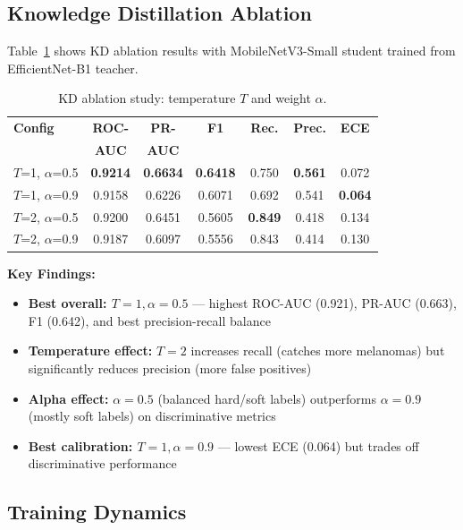 \documentclass[conference]{IEEEtran}
\begin{document}
\subsection{Knowledge Distillation Ablation}

Table~\ref{tab:kd_ablation} shows KD ablation results with MobileNetV3-Small student trained from EfficientNet-B1 teacher.

\begin{table}[t]
\centering
\caption{KD ablation study: temperature $T$ and weight $\alpha$.}
\label{tab:kd_ablation}
\begin{tabular}{lcccccc}
\toprule
\textbf{Config} & \textbf{ROC-} & \textbf{PR-} & \textbf{F1} & \textbf{Rec.} & \textbf{Prec.} & \textbf{ECE} \\
 & \textbf{AUC} & \textbf{AUC} & & & & \\
\midrule
$T$=1, $\alpha$=0.5 & \textbf{0.9214} & \textbf{0.6634} & \textbf{0.6418} & 0.750 & \textbf{0.561} & 0.072 \\
$T$=1, $\alpha$=0.9 & 0.9158 & 0.6226 & 0.6071 & 0.692 & 0.541 & \textbf{0.064} \\
$T$=2, $\alpha$=0.5 & 0.9200 & 0.6451 & 0.5605 & \textbf{0.849} & 0.418 & 0.134 \\
$T$=2, $\alpha$=0.9 & 0.9187 & 0.6097 & 0.5556 & 0.843 & 0.414 & 0.130 \\
\bottomrule
\end{tabular}
\end{table}

\textbf{Key Findings:}
\begin{itemize}
    \item \textbf{Best overall: $T=1, \alpha=0.5$} --- highest ROC-AUC (0.921), PR-AUC (0.663), F1 (0.642), and best precision-recall balance
    \item \textbf{Temperature effect:} $T=2$ increases recall (catches more melanomas) but significantly reduces precision (more false positives)
    \item \textbf{Alpha effect:} $\alpha=0.5$ (balanced hard/soft labels) outperforms $\alpha=0.9$ (mostly soft labels) on discriminative metrics
    \item \textbf{Best calibration: $T=1, \alpha=0.9$} --- lowest ECE (0.064) but trades off discriminative performance
\end{itemize}

\subsection{Training Dynamics}
\end{document}
